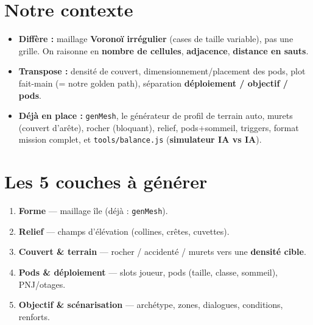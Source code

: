 \documentclass[11pt,a4paper]{article}
\begin{document}
\section{Notre contexte}
\begin{itemize}
\item \textbf{Diffère :} maillage \textbf{Voronoï irrégulier} (cases de taille variable), pas une grille. On raisonne en \textbf{nombre de cellules}, \textbf{adjacence}, \textbf{distance en sauts}.
\item \textbf{Transpose :} densité de couvert, dimensionnement/placement des pods, plot fait-main (= notre golden path), séparation \textbf{déploiement / objectif / pods}.
\item \textbf{Déjà en place :} \texttt{genMesh}, le générateur de profil de terrain auto, murets (couvert d'arête), rocher (bloquant), relief, pods+sommeil, triggers, format mission complet, et \texttt{tools/balance.js} (\textbf{simulateur IA vs IA}).
\end{itemize}

\section{Les 5 couches à générer}
\begin{enumerate}
\item \textbf{Forme} --- maillage île (déjà : \texttt{genMesh}).
\item \textbf{Relief} --- champs d'élévation (collines, crêtes, cuvettes).
\item \textbf{Couvert \& terrain} --- rocher / accidenté / murets vers une \textbf{densité cible}.
\item \textbf{Pods \& déploiement} --- slots joueur, pods (taille, classe, sommeil), PNJ/otages.
\item \textbf{Objectif \& scénarisation} --- archétype, zones, dialogues, conditions, renforts.
\end{enumerate}
\end{document}
